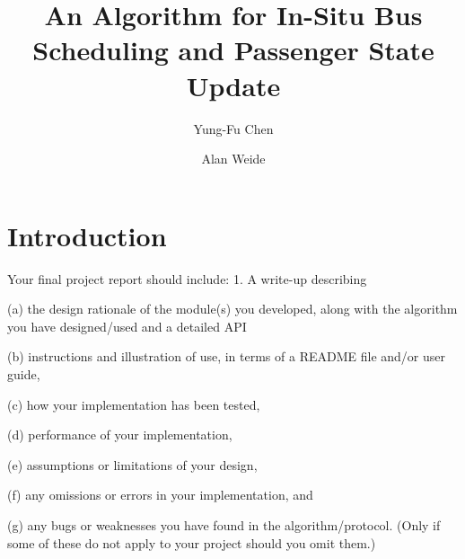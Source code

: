 \documentclass[runningheads]{llncs}
\begin{document}
\mainmatter  %

\title{An Algorithm for In-Situ Bus Scheduling and Passenger State Update}


%
%
\author{Yung-Fu Chen \and Alan Weide}



\maketitle

\renewcommand\thelstlisting{\arabic{lstlisting}}


\section{Introduction}
Your final project report should include:
1. A write-up describing

(a) the design rationale of the module(s) you developed, along with the algorithm you have designed/used and a detailed API

(b) instructions and illustration of use, in terms of a README file and/or user guide,

(c) how your implementation has been tested,

(d) performance of your implementation,

(e) assumptions or limitations of your design,

(f) any omissions or errors in your implementation, and

(g) any bugs or weaknesses you have found in the algorithm/protocol. (Only if some of these do not apply to your project should you omit them.)
\end{document}
